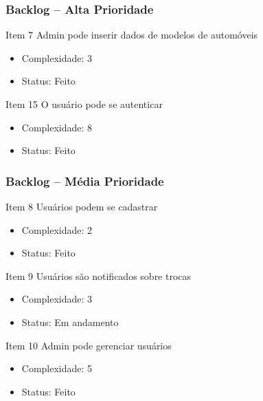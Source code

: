 \documentclass[hyperref={pdfpagelabels=false},11pt]{beamer}
\begin{document}
			\begin{frame}
				\frametitle{Backlog -- Alta Prioridade}
				\begin{block}{Item 7}
					Admin pode inserir dados de modelos de automóveis
					\begin{itemize}
						\item{Complexidade: 3}
						\item{Status: Feito}
					\end{itemize}
				\end{block}
				
				\begin{block}{Item 15}
					O usuário pode se autenticar
					\begin{itemize}
						\item{Complexidade: 8}
						\item{Status: Feito}
					\end{itemize}
				\end{block}
			\end{frame}
			
			\begin{frame}
				\frametitle{Backlog -- Média Prioridade}
				\begin{block}{Item 8}
					Usuários podem se cadastrar
					\begin{itemize}
						\item{Complexidade: 2}
						\item{Status: Feito}
					\end{itemize}
				\end{block}
				
				\begin{block}{Item 9}
					Usuários são notificados sobre trocas
					\begin{itemize}
						\item{Complexidade: 3}
						\item{Status: Em andamento}
					\end{itemize}
				\end{block}
				
				\begin{block}{Item 10}
					Admin pode gerenciar usuários
					\begin{itemize}
						\item{Complexidade: 5}
						\item{Status: Feito}
					\end{itemize}
				\end{block}
			\end{frame}
			
\end{document}
